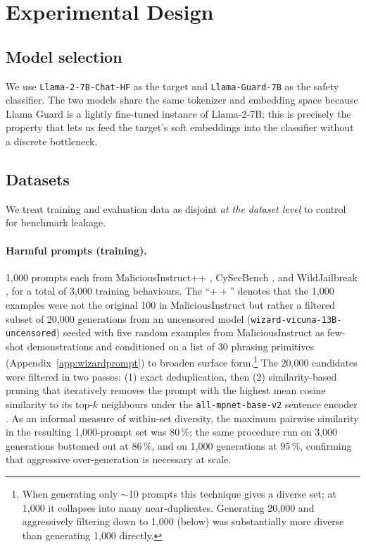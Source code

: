 \documentclass[11pt]{article}
\begin{document}
\section{Experimental Design}\label{sec:expdesign}
\subsection{Model selection}
We use \texttt{Llama-2-7B-Chat-HF} \citep{touvron2023llama2} as the target and
\texttt{Llama-Guard-7B} \citep{inan2023llamaguard} as the safety classifier.
The two models share the same tokenizer and embedding space because Llama
Guard is a lightly fine-tuned instance of Llama-2-7B; this is precisely the
property that lets us feed the target's soft embeddings into the classifier
without a discrete bottleneck.

\subsection{Datasets}
We treat training and evaluation data as disjoint \emph{at the dataset level}
to control for benchmark leakage.
\paragraph{Harmful prompts (training).} 1{,}000 prompts each from
MaliciousInstruct++ \citep{huang2023maliciousinstruct},
CySecBench \citep{cysecbench2025}, and WildJailbreak \citep{jiang2024wildjailbreak},
for a total of 3{,}000 training behaviours. The ``$++$'' denotes that the
1{,}000 examples were not the original 100 in MaliciousInstruct but rather a
filtered subset of 20{,}000 generations from an uncensored model
(\texttt{wizard-vicuna-13B-uncensored}) seeded with five random examples from
MaliciousInstruct as few-shot demonstrations and conditioned on a list of
30 phrasing primitives (Appendix~\ref{app:wizardprompt}) to broaden surface
form.\footnote{When generating only $\sim$10 prompts this technique gives a
diverse set; at 1{,}000 it collapses into many near-duplicates. Generating
20{,}000 and aggressively filtering down to 1{,}000 (below) was substantially
more diverse than generating 1{,}000 directly.}
The 20{,}000 candidates were filtered in two passes: (1) exact deduplication,
then (2) similarity-based pruning that iteratively removes the prompt with the
highest mean cosine similarity to its top-$k$ neighbours under the
\texttt{all-mpnet-base-v2} sentence encoder \citep{reimers2019sbert}. As an
informal measure of within-set diversity, the maximum pairwise similarity in
the resulting 1{,}000-prompt set was 80\,\%; the same procedure run on
3{,}000 generations bottomed out at 86\,\%, and on 1{,}000 generations at
95\,\%, confirming that aggressive over-generation is necessary at scale.
\end{document}
